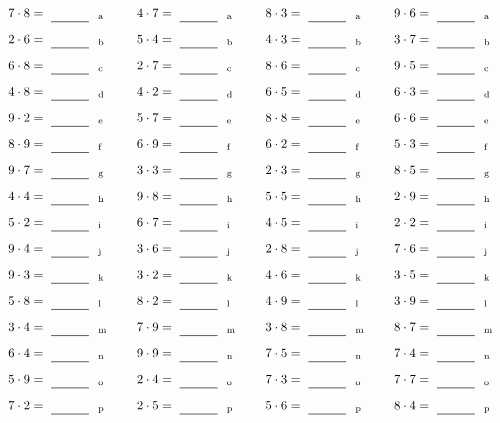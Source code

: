 \documentclass
[
  draft    = true,
  fontsize = 11pt,
  parskip  = half-
]
{scrartcl}
\begin{document}
\par\vfill\par
\begin{align*}
    \pline{7\cdot8}&=\rline{a}
  & \pline{4\cdot7}&=\rline{a}
  & \pline{8\cdot3}&=\rline{a}
  & \pline{9\cdot6}&=\rline{a} \\[1ex]
    \pline{2\cdot6}&=\rline{b}
  & \pline{5\cdot4}&=\rline{b}
  & \pline{4\cdot3}&=\rline{b}
  & \pline{3\cdot7}&=\rline{b} \\[1ex]
    \pline{6\cdot8}&=\rline{c}
  & \pline{2\cdot7}&=\rline{c}
  & \pline{8\cdot6}&=\rline{c}
  & \pline{9\cdot5}&=\rline{c} \\[1ex]
    \pline{4\cdot8}&=\rline{d}
  & \pline{4\cdot2}&=\rline{d}
  & \pline{6\cdot5}&=\rline{d}
  & \pline{6\cdot3}&=\rline{d} \\[1ex]
    \pline{9\cdot2}&=\rline{e}
  & \pline{5\cdot7}&=\rline{e}
  & \pline{8\cdot8}&=\rline{e}
  & \pline{6\cdot6}&=\rline{e} \\[1ex]
    \pline{8\cdot9}&=\rline{f}
  & \pline{6\cdot9}&=\rline{f}
  & \pline{6\cdot2}&=\rline{f}
  & \pline{5\cdot3}&=\rline{f} \\[1ex]
    \pline{9\cdot7}&=\rline{g}
  & \pline{3\cdot3}&=\rline{g}
  & \pline{2\cdot3}&=\rline{g}
  & \pline{8\cdot5}&=\rline{g} \\[1ex]
    \pline{4\cdot4}&=\rline{h}
  & \pline{9\cdot8}&=\rline{h}
  & \pline{5\cdot5}&=\rline{h}
  & \pline{2\cdot9}&=\rline{h} \\[1ex]
    \pline{5\cdot2}&=\rline{i}
  & \pline{6\cdot7}&=\rline{i}
  & \pline{4\cdot5}&=\rline{i}
  & \pline{2\cdot2}&=\rline{i} \\[1ex]
    \pline{9\cdot4}&=\rline{j}
  & \pline{3\cdot6}&=\rline{j}
  & \pline{2\cdot8}&=\rline{j}
  & \pline{7\cdot6}&=\rline{j} \\[1ex]
    \pline{9\cdot3}&=\rline{k}
  & \pline{3\cdot2}&=\rline{k}
  & \pline{4\cdot6}&=\rline{k}
  & \pline{3\cdot5}&=\rline{k} \\[1ex]
    \pline{5\cdot8}&=\rline{l}
  & \pline{8\cdot2}&=\rline{l}
  & \pline{4\cdot9}&=\rline{l}
  & \pline{3\cdot9}&=\rline{l} \\[1ex]
    \pline{3\cdot4}&=\rline{m}
  & \pline{7\cdot9}&=\rline{m}
  & \pline{3\cdot8}&=\rline{m}
  & \pline{8\cdot7}&=\rline{m} \\[1ex]
    \pline{6\cdot4}&=\rline{n}
  & \pline{9\cdot9}&=\rline{n}
  & \pline{7\cdot5}&=\rline{n}
  & \pline{7\cdot4}&=\rline{n} \\[1ex]
    \pline{5\cdot9}&=\rline{o}
  & \pline{2\cdot4}&=\rline{o}
  & \pline{7\cdot3}&=\rline{o}
  & \pline{7\cdot7}&=\rline{o} \\[1ex]
    \pline{7\cdot2}&=\rline{p}
  & \pline{2\cdot5}&=\rline{p}
  & \pline{5\cdot6}&=\rline{p}
  & \pline{8\cdot4}&=\rline{p}
\end{align*}
\end{document}
